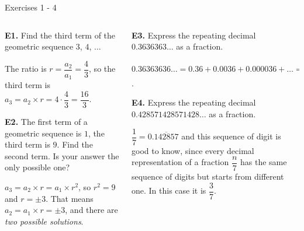 \documentclass[9pt,aspectratio=169]{beamer}
\begin{document}
\begin{frame}{Exercises 1 - 4}
  \begin{columns}[T]
    \begin{column}{0.5\textwidth}
      \begin{problem}
        \textbf{E1.} Find the third term of the geometric sequence $3$, $4$, $\ldots$
      \end{problem}
      The ratio is $r = \dfrac{a_2}{a_1} = \dfrac{4}{3}$, so the third term is $a_3 = a_2 \times r = 4 \cdot \dfrac{4}{3} = \boxed{\dfrac{16}{3}}$.
      \begin{problem}
        \textbf{E2.} The first term of a geometric sequence is $1$, the third term is $9$. Find the second term. Is your answer the only possible one?
      \end{problem}
      $a_3 = a_2 \times r = a_1 \times r^2$, so $r^2 = 9$ and $r = \pm 3$. That means $a_2 = a_1 \times r = \boxed{\pm 3}$, and there are \emph{two possible solutions}.
    \end{column}
    \begin{column}{0.5\textwidth}
      \begin{problem}
        \textbf{E3.} Express the repeating decimal $0.3636363\ldots$ as a fraction.
      \end{problem}
      $0.36363636\ldots = 0.36 + 0.0036 + 0.000036 + \ldots = \dfrac{0.36}{1 - 0.01} = \dfrac{36}{99} = \boxed{\dfrac{4}{11}}$.
      \begin{problem}
        \textbf{E4.} Express the repeating decimal $0.428571428571428\ldots$ as a fraction.
      \end{problem}
      $\dfrac{1}{7} = 0.\overline{142857}$ and this sequence of digit is good to know, since every decimal representation of a fraction $\dfrac{n}{7}$ has the same sequence of digits but starts from different one. In this case it is $\boxed{\dfrac{3}{7}}$.
    \end{column}
  \end{columns}
\end{frame}
\end{document}
